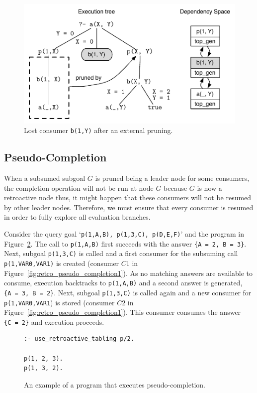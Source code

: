 \begin{figure}[ht]
  \centering
    \includegraphics[scale=0.6]{retro_lost_consumer.pdf}
  \caption{Lost consumer \texttt{b(1,Y)} after an external pruning.}
  \label{fig:retro_lost_consumer}
\end{figure}

\subsection{Pseudo-Completion}

When a subsumed subgoal $G$ is pruned being a leader node for some consumers, the completion operation
will not be run at node $G$ because $G$ is now a retroactive node thus, it might happen that these consumers
will not be resumed by other leader nodes. Therefore, we must ensure that every consumer is
resumed in order to fully explore all evaluation branches.

Consider the query goal `\texttt{p(1,A,B),~p(1,3,C),~p(D,E,F)}' and the program in Figure~\ref{fig:retro_ignored_consumer}.
The call to \texttt{p(1,A,B)} first succeeds with the answer \texttt{\{A~=~2,~B~=~3\}}. Next, subgoal \texttt{p(1,3,C)}
is called and a first consumer for the subsuming call \texttt{p(1,VAR0,VAR1)} is created (consumer $C1$ in
Figure~\ref{fig:retro_pseudo_completion1}). As no matching answers are available to consume, execution
backtracks to \texttt{p(1,A,B)} and a second answer is generated, \texttt{\{A~=~3,~B~=~2\}}. Next,
subgoal \texttt{p(1,3,C)} is called again and a new consumer for \texttt{p(1,VAR0,VAR1}) is stored
(consumer $C2$ in Figure~\ref{fig:retro_pseudo_completion1}).
This consumer consumes the answer \texttt{\{C~=~2\}} and execution proceeds. 

\begin{figure}[ht]
\begin{Verbatim}
:- use_retroactive_tabling p/2.

p(1, 2, 3).
p(1, 3, 2).
\end{Verbatim}
\caption{An example of a program that executes pseudo-completion.}
\label{fig:retro_ignored_consumer}
\end{figure}

